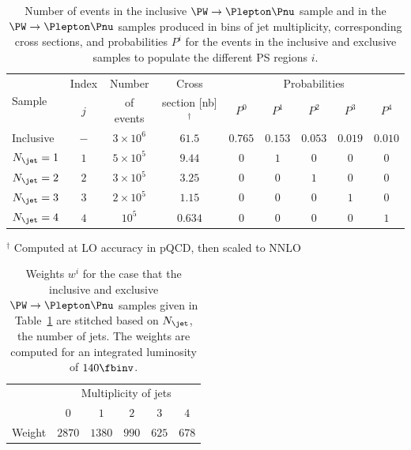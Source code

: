 \begin{table}[h!]
\begin{center}
\def\arraystretch{1.3}
\begin{tabular}{l|c|c|c|ccccc}
\hline
\multirow{2}{20mm}{Sample} & Index & Number    & Cross                    & \multicolumn{5}{c}{Probabilities}               \\
                           & $j$   & of events & section [nb]$^{\dagger}$ & $P^{0}$ & $P^{1}$ & $P^{2}$ & $P^{3}$ & $P^{4}$ \\
\hline
\hline
Inclusive                  & $-$   & $3 \times 10^{6}$ & $61.5$ & $0.765$ & $0.153$ & $0.053$ & $0.019$ & $0.010$ \\
\hline
$N_{\jet} = 1$             & $1$   & $5 \times 10^{5}$ & $9.44$  & $0$     & $1$     & $0$     & $0$     & $0$     \\
$N_{\jet} = 2$             & $2$   & $3 \times 10^{5}$ & $3.25$  & $0$     & $0$     & $1$     & $0$     & $0$     \\
$N_{\jet} = 3$             & $3$   & $2 \times 10^{5}$ & $1.15$  & $0$     & $0$     & $0$     & $1$     & $0$     \\
$N_{\jet} = 4$             & $4$   & $         10^{5}$ & $0.634$ & $0$     & $0$     & $0$     & $0$     & $1$     \\
\hline
\end{tabular}
\end{center}
$^{\dagger}$ Computed at LO accuracy in pQCD, then scaled to NNLO
\caption{
  Number of events in the inclusive $\PW \to \Plepton\Pnu$ sample and in the $\PW \to \Plepton\Pnu$ samples produced in bins of jet multiplicity,
  corresponding cross sections,
  and probabilities $P^{i}$ for the events in the inclusive and exclusive samples to populate the different PS regions $i$.
}
\label{tab:samples_and_probabilities_WJets_vs_Njet}
\end{table}

\begin{table}[h!]
\begin{center}
\begin{tabular}{l|ccccc}
\hline
 & \multicolumn{5}{c}{Multiplicity of jets} \\
 & $0$ & $1$ & $2$ & $3$ & $4$ \\
\hline
\hline
Weight & $2870$ & $1380$ & $990$ & $625$ & $678$ \\
\hline
\end{tabular}
\end{center}
\caption{
  Weights $w^{i}$ for the case that the inclusive and exclusive $\PW \to \Plepton\Pnu$ samples 
  given in Table~\ref{tab:samples_and_probabilities_WJets_vs_Njet}
  are stitched based on $N_{\jet}$, the number of jets.
  The weights are computed for an integrated luminosity of $140\fbinv$.
}
\label{tab:weights_WJets_vs_Njet}
\end{table}

